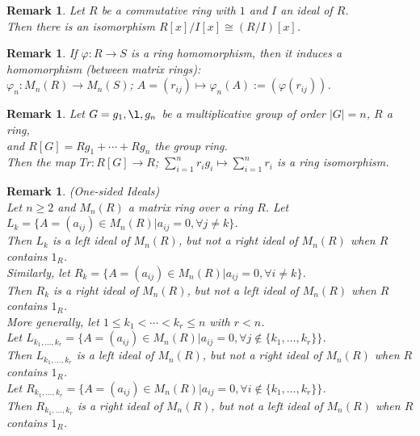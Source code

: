 \documentclass[a4paper,sfsidenotes,openany]{tufte-book}
\theoremstyle{theorem}
\newtheorem{remark}[theorem]{Remark}
\begin{document}
\begin{fullwidth}
\begin{remark}
Let $R$ be a commutative ring with $1$ and $I$ an ideal of $R$.\\
Then there is an isomorphism $R[x]/I[x] \cong (R/I)[x]$.\\	
\end{remark}
\>

\begin{remark}
If $\varphi: R \rightarrow S$ is a ring homomorphism, then it induces a homomorphism (between matrix rings):\\
$\varphi_n: M_n(R) \rightarrow M_n(S)$; $A = (r_{ij}) \mapsto \varphi_n(A) := (\varphi(r_{ij}))$.\\
\end{remark}
\>

\begin{remark}
Let $G={g_1, \l , g_n}$ be a multiplicative group of order $\left| G \right| = n$, $R$ a ring, \\
and $R[G]=Rg_1 + \cdots + Rg_n$ the group ring.\\
Then the map $Tr: R[G] \rightarrow R$; $\sum_{i=1}^{n} r_i g_i \mapsto \sum_{i=1}^{n} r_i$ is a ring isomorphism.\\
\end{remark}
\>

\begin{remark}
\textit{{\color{blue} (One-sided Ideals)}}\\
Let $n \geq 2$ and $M_n(R)$ a matrix ring over a ring $R$. Let $L_k = \{A = (a_{ij}) \in M_n(R) | a_{ij} = 0, \forall j \neq k\}$.\\
Then $L_k$ is a left ideal of $M_n(R)$, but not a right ideal of $M_n(R)$ when $R$ contains $1_R$.\\
Similarly, let $R_k = \{A = (a_{ij}) \in M_n(R) | a_{ij} = 0, \forall i \neq k\}$.\\
Then $R_k$ is a right ideal of $M_n(R)$, but not a left ideal of $M_n(R)$ when $R$ contains $1_R$.\\
\>
More generally, let $1 \leq k_1 < \cdots < k_r \leq n$ with $r < n$.\\
Let $L_{k_1, \ldots, k_r} = \{A = (a_{ij}) \in M_n(R) | a_{ij} = 0, \forall j \notin \{k_1, \ldots, k_r\}\}$.\\
Then $L_{k_1, \ldots, k_r}$ is a left ideal of $M_n(R)$, but not a right ideal of $M_n(R)$ when $R$ contains $1_R$.\\
Let $R_{k_1, \ldots, k_r} = \{A = (a_{ij}) \in M_n(R) | a_{ij} = 0, \forall i \notin \{k_1, \ldots, k_r\}\}$.\\
Then $R_{k_1, \ldots, k_r}$ is a right ideal of $M_n(R)$, but not a left ideal of $M_n(R)$ when $R$ contains $1_R$.\\
\end{remark}
\>


\end{fullwidth}
\end{document}
